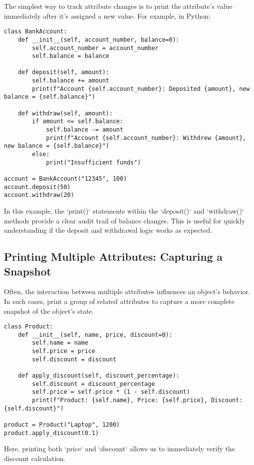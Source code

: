 \documentclass{article}
\begin{document}
{{{The simplest way to track attribute changes is to print the attribute's value immediately after it's assigned a new value. For example, in Python:

\begin{verbatim}
class BankAccount:
    def __init__(self, account_number, balance=0):
        self.account_number = account_number
        self.balance = balance

    def deposit(self, amount):
        self.balance += amount
        print(f"Account {self.account_number}: Deposited {amount}, new balance = {self.balance}")

    def withdraw(self, amount):
        if amount <= self.balance:
            self.balance -= amount
            print(f"Account {self.account_number}: Withdrew {amount}, new balance = {self.balance}")
        else:
            print("Insufficient funds")

account = BankAccount("12345", 100)
account.deposit(50)
account.withdraw(20)
\end{verbatim}

In this example, the `print()` statements within the `deposit()` and `withdraw()` methods provide a clear audit trail of balance changes.  This is useful for quickly understanding if the deposit and withdrawal logic works as expected.

\subsection*{Printing Multiple Attributes: Capturing a Snapshot}

Often, the interaction between multiple attributes influences an object's behavior.  In such cases, print a group of related attributes to capture a more complete snapshot of the object's state.

\begin{verbatim}
class Product:
    def __init__(self, name, price, discount=0):
        self.name = name
        self.price = price
        self.discount = discount

    def apply_discount(self, discount_percentage):
        self.discount = discount_percentage
        self.price = self.price * (1 - self.discount)
        print(f"Product: {self.name}, Price: {self.price}, Discount: {self.discount}")

product = Product("Laptop", 1200)
product.apply_discount(0.1)
\end{verbatim}

Here, printing both `price` and `discount` allows us to immediately verify the discount calculation.

}}}
\end{document}
